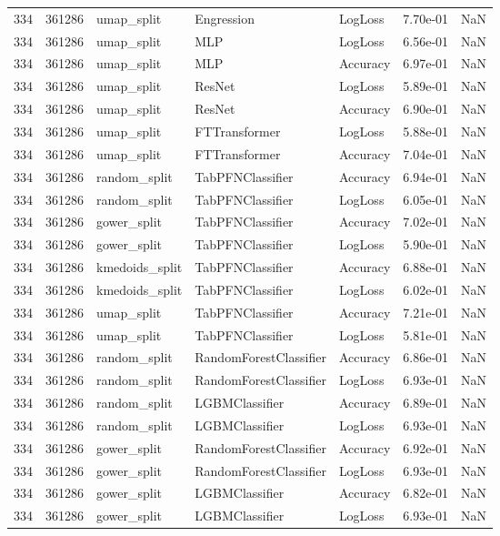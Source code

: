\begin{tabular}{rrlllrr}
334 & 361286 & umap\_split & Engression & LogLoss & 7.70e-01 & NaN \\
334 & 361286 & umap\_split & MLP & LogLoss & 6.56e-01 & NaN \\
334 & 361286 & umap\_split & MLP & Accuracy & 6.97e-01 & NaN \\
334 & 361286 & umap\_split & ResNet & LogLoss & 5.89e-01 & NaN \\
334 & 361286 & umap\_split & ResNet & Accuracy & 6.90e-01 & NaN \\
334 & 361286 & umap\_split & FTTransformer & LogLoss & 5.88e-01 & NaN \\
334 & 361286 & umap\_split & FTTransformer & Accuracy & 7.04e-01 & NaN \\
334 & 361286 & random\_split & TabPFNClassifier & Accuracy & 6.94e-01 & NaN \\
334 & 361286 & random\_split & TabPFNClassifier & LogLoss & 6.05e-01 & NaN \\
334 & 361286 & gower\_split & TabPFNClassifier & Accuracy & 7.02e-01 & NaN \\
334 & 361286 & gower\_split & TabPFNClassifier & LogLoss & 5.90e-01 & NaN \\
334 & 361286 & kmedoids\_split & TabPFNClassifier & Accuracy & 6.88e-01 & NaN \\
334 & 361286 & kmedoids\_split & TabPFNClassifier & LogLoss & 6.02e-01 & NaN \\
334 & 361286 & umap\_split & TabPFNClassifier & Accuracy & 7.21e-01 & NaN \\
334 & 361286 & umap\_split & TabPFNClassifier & LogLoss & 5.81e-01 & NaN \\
334 & 361286 & random\_split & RandomForestClassifier & Accuracy & 6.86e-01 & NaN \\
334 & 361286 & random\_split & RandomForestClassifier & LogLoss & 6.93e-01 & NaN \\
334 & 361286 & random\_split & LGBMClassifier & Accuracy & 6.89e-01 & NaN \\
334 & 361286 & random\_split & LGBMClassifier & LogLoss & 6.93e-01 & NaN \\
334 & 361286 & gower\_split & RandomForestClassifier & Accuracy & 6.92e-01 & NaN \\
334 & 361286 & gower\_split & RandomForestClassifier & LogLoss & 6.93e-01 & NaN \\
334 & 361286 & gower\_split & LGBMClassifier & Accuracy & 6.82e-01 & NaN \\
334 & 361286 & gower\_split & LGBMClassifier & LogLoss & 6.93e-01 & NaN \\

\end{tabular}
